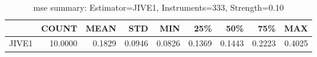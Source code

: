 \begin{table}[ht]
\centering
\caption{mse summary: Estimator=JIVE1, Instruments=333, Strength=0.10}
\begin{tabular}{lrrrrrrrr}
\toprule
 & COUNT & MEAN & STD & MIN & 25\% & 50\% & 75\% & MAX \\
\midrule
JIVE1 & 10.0000 & 0.1829 & 0.0946 & 0.0826 & 0.1369 & 0.1443 & 0.2223 & 0.4025 \\
\bottomrule
\end{tabular}
\end{table}
